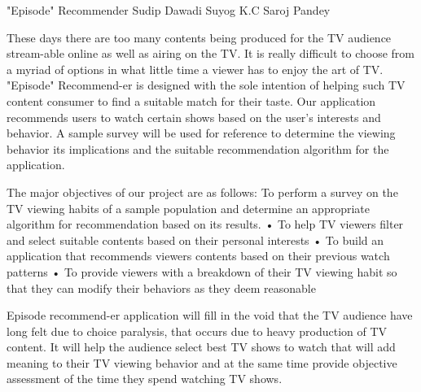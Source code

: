  \begin{conf-abstract}[]
 {"Episode" Recommender}
 {Sudip Dawadi
 	Suyog K.C
 	Saroj Pandey
 }
{}

These days there are too many contents being produced for the TV audience stream-able online as well as airing on the TV. It is really difficult to choose from a myriad of options in what little time a viewer has to enjoy the art of TV. "Episode" Recommend-er is designed with the sole intention of helping such TV content consumer to find a suitable match for their taste. Our application recommends users to watch certain shows based on the user's interests and behavior. A sample survey will be used for reference to determine the viewing behavior its implications and the suitable recommendation algorithm for the application.

The major objectives of our project are as follows:
To perform a survey on the TV viewing habits of a sample population and determine an appropriate algorithm for recommendation based on its results.
•	To help TV viewers filter and select suitable contents based on their personal interests
•	To build an application that recommends viewers contents based on their previous watch patterns
•	To provide viewers with a breakdown of their TV viewing habit so that they can modify their behaviors as they deem reasonable

Episode recommend-er application will fill in the void that the TV audience have long felt due to choice paralysis, that occurs due to heavy production of TV content. It will help the audience select best TV shows to watch that will add meaning to their TV viewing behavior and at the same time provide objective assessment of the time they spend watching TV shows. 
 \end{conf-abstract}